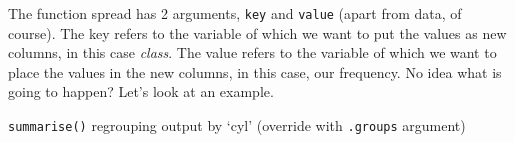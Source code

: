 \documentclass[]{tufte-book}
\newenvironment{Shaded}{}{}
\newcommand{\DataTypeTok}[1]{\textcolor[rgb]{0.56,0.13,0.00}{#1}}
\newcommand{\KeywordTok}[1]{\textcolor[rgb]{0.00,0.44,0.13}{\textbf{#1}}}
\newcommand{\NormalTok}[1]{#1}
\newcommand{\OperatorTok}[1]{\textcolor[rgb]{0.40,0.40,0.40}{#1}}
\newcommand{\StringTok}[1]{\textcolor[rgb]{0.25,0.44,0.63}{#1}}
\begin{document}
The function spread has 2 arguments, \texttt{key} and \texttt{value} (apart from data, of course). The key refers to the variable of which we want to put the values as new columns, in this case \emph{class}. The value refers to the variable of which we want to place the values in the new columns, in this case, our frequency. No idea what is going to happen? Let's look at an example.

\begin{Shaded}
\end{Shaded}

\texttt{summarise()} regrouping output by `cyl' (override with \texttt{.groups} argument)
\end{document}
